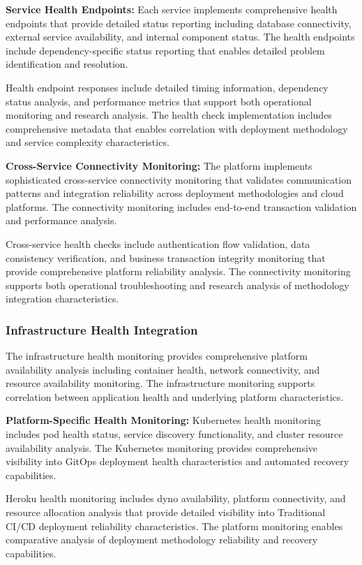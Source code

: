\textbf{Service Health Endpoints:}
Each service implements comprehensive health endpoints that provide detailed status reporting including database connectivity, external service availability, and internal component status. The health endpoints include dependency-specific status reporting that enables detailed problem identification and resolution.

Health endpoint responses include detailed timing information, dependency status analysis, and performance metrics that support both operational monitoring and research analysis. The health check implementation includes comprehensive metadata that enables correlation with deployment methodology and service complexity characteristics.

\textbf{Cross-Service Connectivity Monitoring:}
The platform implements sophisticated cross-service connectivity monitoring that validates communication patterns and integration reliability across deployment methodologies and cloud platforms. The connectivity monitoring includes end-to-end transaction validation and performance analysis.

Cross-service health checks include authentication flow validation, data consistency verification, and business transaction integrity monitoring that provide comprehensive platform reliability analysis. The connectivity monitoring supports both operational troubleshooting and research analysis of methodology integration characteristics.

\subsubsection{Infrastructure Health Integration}

The infrastructure health monitoring provides comprehensive platform availability analysis including container health, network connectivity, and resource availability monitoring. The infrastructure monitoring supports correlation between application health and underlying platform characteristics.

\textbf{Platform-Specific Health Monitoring:}
Kubernetes health monitoring includes pod health status, service discovery functionality, and cluster resource availability analysis. The Kubernetes monitoring provides comprehensive visibility into GitOps deployment health characteristics and automated recovery capabilities.

Heroku health monitoring includes dyno availability, platform connectivity, and resource allocation analysis that provide detailed visibility into Traditional CI/CD deployment reliability characteristics. The platform monitoring enables comparative analysis of deployment methodology reliability and recovery capabilities.

